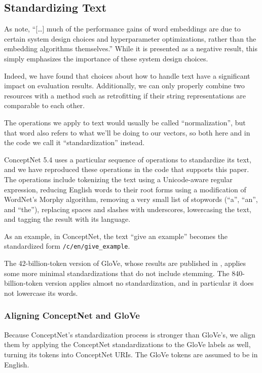 \documentclass[11pt]{article}
\begin{document}
\subsection{Standardizing Text}

As  note,
``[\ldots] much of the performance gains of word embeddings are due to certain
system design choices and hyperparameter optimizations, rather than the
embedding algorithms themselves.'' While it is presented as a negative result,
this simply emphasizes the importance of these system design choices.

Indeed, we have found that choices about how to handle text have a significant
impact on evaluation results. Additionally, we can only properly combine two
resources with a method such as retrofitting if their string representations
are comparable to each other.

The operations we apply to text would usually be called ``normalization'',
but that word also refers to what we'll be doing to our vectors, so both
here and in the code we call it ``standardization'' instead.

ConceptNet 5.4 uses a particular sequence of operations to standardize its
text, and we have reproduced these operations in the code that supports this
paper.  The operations include tokenizing the text using a Unicode-aware
regular expression, reducing English words to their root forms using a
modification of WordNet's Morphy algorithm, removing a very small list of
stopwords (``a'', ``an'', and ``the''), replacing spaces and slashes with
underscores, lowercasing the text, and tagging the result with its language.

As an example, in ConceptNet, the text ``give an example'' becomes the standardized form
{\tt /c/en/give\_example}.

The 42-billion-token version of GloVe, whose results are published in
\cite{pennington2014glove}, applies some more minimal standardizations that do
not include stemming. The 840-billion-token version applies almost no
standardization, and in particular it does not lowercase its words.

\subsubsection{Aligning ConceptNet and GloVe}

Because ConceptNet's standardization process is stronger than GloVe's, we align them
by applying the ConceptNet standardizations to the GloVe labels as well, turning
its tokens into ConceptNet URIs. The GloVe tokens are assumed to be in English.
\end{document}
